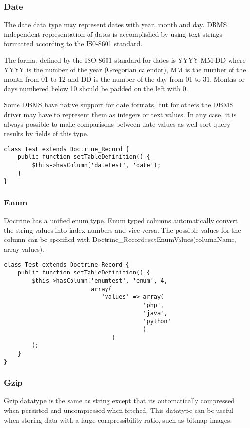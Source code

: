 \documentclass[11pt,a4paper]{report}
\begin{document}
\subsubsection{Date}
The date data type may represent dates with year, month and day. DBMS independent representation of dates is accomplished by using text strings formatted according to the IS0-8601 standard.

The format defined by the ISO-8601 standard for dates is YYYY-MM-DD where YYYY is the number of the year (Gregorian calendar), MM is the number of the month from 01 to 12 and DD is the number of the day from 01 to 31. Months or days numbered below 10 should be padded on the left with 0.

Some DBMS have native support for date formats, but for others the DBMS driver may have to represent them as integers or text values. In any case, it is always possible to make comparisons between date values as well sort query results by fields of this type.

\begin{verbatim}
class Test extends Doctrine_Record {
    public function setTableDefinition() {
        $this->hasColumn('datetest', 'date');
    }
}
\end{verbatim}

\subsubsection{Enum}
Doctrine has a unified enum type. Enum typed columns automatically convert the string values into index numbers and vice versa. The possible values for the column can be specified with Doctrine\_Record::setEnumValues(columnName, array values).

\begin{verbatim}
class Test extends Doctrine_Record {
    public function setTableDefinition() {
        $this->hasColumn('enumtest', 'enum', 4,
                         array(
                            'values' => array(
                                        'php',
                                        'java',
                                        'python'
                                        )
                               )
        );
    }
}
\end{verbatim}

\subsubsection{Gzip}
Gzip datatype is the same as string except that its automatically compressed when persisted and uncompressed when fetched. This datatype can be useful when storing data with a large compressibility ratio, such as bitmap images.
\end{document}
